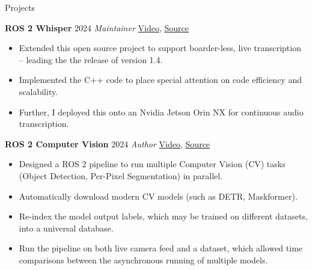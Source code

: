 \begin{rubric}{Projects}

\entry*[] \textbf{ROS 2 Whisper} \hfill 2024 \newline
\emph{Maintainer} \hfill  \href{https://github.com/ros-ai/ros2_whisper/blob/main/doc/harry_potter_sample.gif}{Video}, \href{https://github.com/ros-ai/ros2_whisper}{\faGithub Source} \newline
\vspace{\CVItemizeHeaderSpacing} \begin{itemize}[leftmargin=*, rightmargin=1cm]
	\setlength{\itemsep}{\CVItemizeSpacing}
	\item Extended this open source project to support boarder-less, live transcription -- leading the the release of version 1.4.
	\item Implemented the C++ code to place special attention on code efficiency and scalability.
	\item Further, I deployed this onto an Nvidia Jetson Orin NX for continuous audio transcription.
\end{itemize}

\entry*[] \textbf{ROS 2 Computer Vision} \hfill 2024 \newline
\emph{Author} \hfill \href{https://github.com/NathanCorral/ROS-HF-Vision/blob/main/doc/gifs/ex_german_roads.gif}{Video}, \href{https://github.com/NathanCorral/ROS-HF-Vision/tree/main}{\faGithub Source} \newline
\vspace{\CVItemizeHeaderSpacing} \begin{itemize}[leftmargin=*, rightmargin=1cm]
	\setlength{\itemsep}{\CVItemizeSpacing}
	\item Designed a ROS 2 pipeline to run multiple Computer Vision (CV) tasks (Object Detection, Per-Pixel Segmentation) in parallel.  
	\item Automatically download modern CV models (such as DETR, Maskformer).  
	\item Re-index the model output labels, which may be trained on different datasets, into a universal database.  
	\item Run the pipeline on both live camera feed and a dataset, which allowed time comparisons between the asynchronous running of multiple models.
\end{itemize}


\end{rubric}
